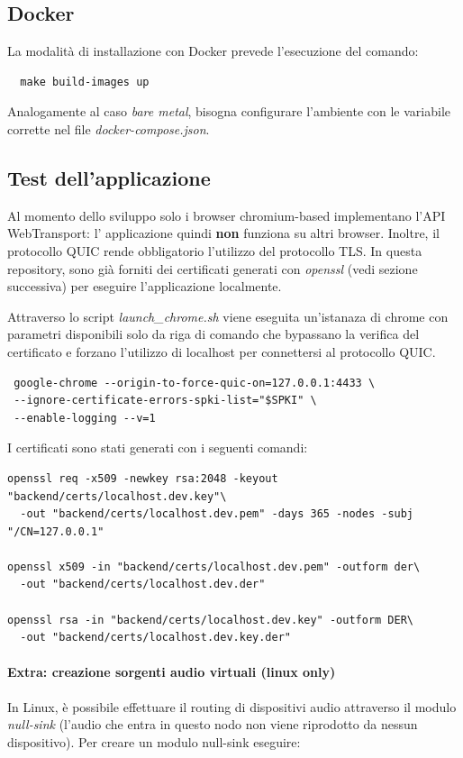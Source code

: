 \documentclass{article}
\begin{document}
\subsection{Docker}
La modalità di installazione con Docker prevede l'esecuzione del comando:
\begin{verbatim}
  make build-images up 
\end{verbatim}
Analogamente al caso \textit{bare metal}, bisogna configurare l'ambiente con le variabile 
corrette nel file \textit{docker-compose.json}.

\subsection{Test dell'applicazione} 
Al momento dello sviluppo solo i browser chromium-based implementano l'API WebTransport: l'
applicazione quindi \textbf{non} funziona su altri browser. Inoltre, il protocollo QUIC rende
obbligatorio l'utilizzo del protocollo TLS. In questa repository, sono già forniti dei
certificati generati con \textit{openssl} (vedi sezione successiva) per eseguire l'applicazione
localmente.

Attraverso lo script \textit{launch\_chrome.sh} viene eseguita un'istanaza di chrome con parametri
disponibili solo da riga di comando che bypassano la verifica del certificato e forzano
l'utilizzo di localhost per connettersi al protocollo QUIC. 
\begin{verbatim}
 google-chrome --origin-to-force-quic-on=127.0.0.1:4433 \ 
 --ignore-certificate-errors-spki-list="$SPKI" \ 
 --enable-logging --v=1
\end{verbatim}

I certificati sono stati generati con i seguenti comandi:
\begin{verbatim}
openssl req -x509 -newkey rsa:2048 -keyout "backend/certs/localhost.dev.key"\ 
  -out "backend/certs/localhost.dev.pem" -days 365 -nodes -subj "/CN=127.0.0.1"

openssl x509 -in "backend/certs/localhost.dev.pem" -outform der\
  -out "backend/certs/localhost.dev.der"

openssl rsa -in "backend/certs/localhost.dev.key" -outform DER\ 
  -out "backend/certs/localhost.dev.key.der"
\end{verbatim}

\paragraph{Extra: creazione sorgenti audio virtuali (linux only)}
In Linux, è possibile effettuare il routing di dispositivi audio attraverso il modulo \textit{null-sink}
(l'audio che entra in questo nodo non viene riprodotto da nessun dispositivo). Per creare 
un modulo null-sink eseguire:
\end{document}
